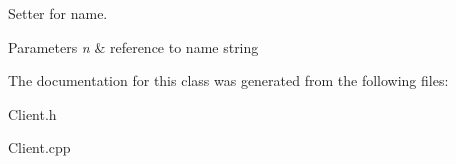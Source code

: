 Setter for name. 


\begin{DoxyParams}{Parameters}
{\em n} & reference to name string \\
\hline
\end{DoxyParams}


The documentation for this class was generated from the following files\+:\begin{DoxyCompactItemize}
\item 
Client.\+h\item 
Client.\+cpp\end{DoxyCompactItemize}

